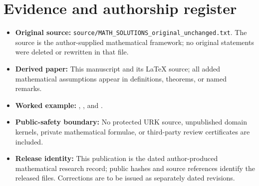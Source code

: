 \documentclass[11pt,letterpaper]{article}
\theoremstyle{definition}\newtheorem{definition}[theorem]{Definition}\newtheorem{example}[theorem]{Example}
\theoremstyle{remark}\newtheorem{remark}[theorem]{Remark}
\begin{document}
\section{Evidence and authorship register}
\begin{itemize}
\item \textbf{Original source:} \texttt{source/MATH\_SOLUTIONS\_original\_unchanged.txt}. The source is the author-supplied mathematical framework; no original statements were deleted or rewritten in that file.
\item \textbf{Derived paper:} This manuscript and its LaTeX source; all added mathematical assumptions appear in definitions, theorems, or named remarks.
\item \textbf{Worked example:} , , and .
\item \textbf{Public-safety boundary:} No protected URK source, unpublished domain kernels, private mathematical formulae, or third-party review certificates are included.
\item \textbf{Release identity:} This publication is the dated author-produced mathematical research record; public hashes and source references identify the released files. Corrections are to be issued as separately dated revisions.
\end{itemize}
\end{document}
